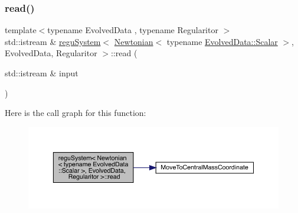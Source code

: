 \subsubsection{\texorpdfstring{read()}{read()}}
{\footnotesize\ttfamily template$<$typename Evolved\+Data , typename Regularitor $>$ \\
std\+::istream \& \mbox{\hyperlink{classregu_system}{regu\+System}}$<$ \mbox{\hyperlink{class_newtonian}{Newtonian}}$<$ typename \mbox{\hyperlink{classregu_system_aca8ee2c387943164ee3ea68370fc3ac0}{Evolved\+Data\+::\+Scalar}} $>$, Evolved\+Data, Regularitor $>$\+::read (\begin{DoxyParamCaption}\item[{std\+::istream \&}]{input }\end{DoxyParamCaption})}

Here is the call graph for this function\+:
\nopagebreak
\begin{figure}[H]
\begin{center}
\leavevmode
\includegraphics[width=350pt]{classregu_system_3_01_newtonian_3_01typename_01_evolved_data_1_1_scalar_01_4_00_01_evolved_data_00_01_regularitor_01_4_a0cfd66a24e4b23158a6450510c40ab31_cgraph}
\end{center}
\end{figure}
\mbox{\label{classregu_system_3_01_newtonian_3_01typename_01_evolved_data_1_1_scalar_01_4_00_01_evolved_data_00_01_regularitor_01_4_a168315b01bf058c43a97b0d364a5f649}} 
